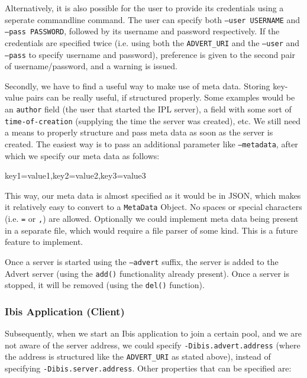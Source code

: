Alternatively, it is also possible for the user to provide its credentials
using a seperate commandline command. The user can specify both \texttt{--user
USERNAME} and \texttt{--pass PASSWORD}, followed by its username and password
respectively. If the credentials are specified twice (i.e. using both the
\texttt{ADVERT\_URI} and the \texttt{--user} and \texttt{--pass} to specify
username and password), preference is given to the second pair of
username/password, and a warning is issued.

Secondly, we have to find a useful way to make use of meta data. Storing
key-value pairs can be really useful, if structured properly. Some examples
would be an \texttt{author} field (the user that started the IPL server), a
field with some sort of \texttt{time-of-creation} (supplying the time the
server was created), etc. We still need a means to properly structure
and pass meta data as soon as the server is created. The easiest way is to pass
an additional parameter like \texttt{--metadata}, after which we specify our
meta data as follows:

\begin{center}
\begin{code}
key1=value1,key2=value2,key3=value3
\end{code}
\end{center}

This way, our meta data is almost specified as it would be in JSON, which makes
it relatively easy to convert to a \texttt{MetaData} Object. No spaces or
special characters (i.e. \texttt{=} or \texttt{,}) are allowed. Optionally we
could implement meta data being present in a separate file, which would require a
file parser of some kind. This is a future feature to implement.

Once a server is started using the \texttt{--advert} suffix, the server is added
to the Advert server (using the \texttt{add()} functionality already present).
Once a server is stopped, it will be removed (using the \texttt{del()}
function).

\subsubsection{Ibis Application (Client)}
Subsequently, when we start an Ibis application to join a certain pool, and we
are not aware of the server address, we could specify
\texttt{-Dibis.advert.address} (where the address is structured like the
\texttt{ADVERT\_URI} as stated above), instead of specifying
\texttt{-Dibis.server.address}. Other properties that can be specified are:

